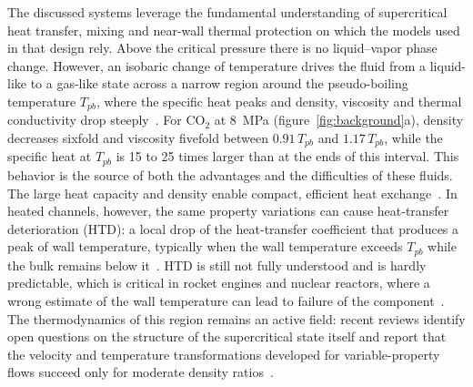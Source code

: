 \documentclass[11pt]{article}
\begin{document}

The discussed systems leverage the fundamental understanding of supercritical heat transfer, mixing and near-wall thermal protection on which the models used in that design rely. 
Above the critical pressure there is no liquid--vapor phase change. 
However, an isobaric change of temperature drives the fluid from a liquid-like to a gas-like state across a narrow region around the pseudo-boiling temperature $T_{pb}$, where the specific heat peaks and density, viscosity and thermal conductivity drop steeply~\cite{Banuti2015}. 
For CO$_2$ at 8~MPa (figure~\ref{fig:background}a), density decreases sixfold and viscosity fivefold between $0.91\,T_{pb}$ and $1.17\,T_{pb}$, while the specific heat at $T_{pb}$ is 15 to 25 times larger than at the ends of this interval. 
This behavior is the source of both the advantages and the difficulties of these fluids. 
The large heat capacity and density enable compact, efficient heat exchange~\cite{Ahn2015}. 
In heated channels, however, the same property variations can cause heat-transfer deterioration (HTD): a local drop of the heat-transfer coefficient that produces a peak of wall temperature, typically when the wall temperature exceeds $T_{pb}$ while the bulk remains below it~\cite{Urbano2013}. 
HTD is still not fully understood and is hardly predictable, which is critical in rocket engines and nuclear reactors, where a wrong estimate of the wall temperature can lead to failure of the component~\cite{Pizzarelli2018}. 
The thermodynamics of this region remains an active field: recent reviews identify open questions on the structure of the supercritical state itself and report that the velocity and temperature transformations developed for variable-property flows succeed only for moderate density ratios~\cite{Li2025}.
\end{document}
